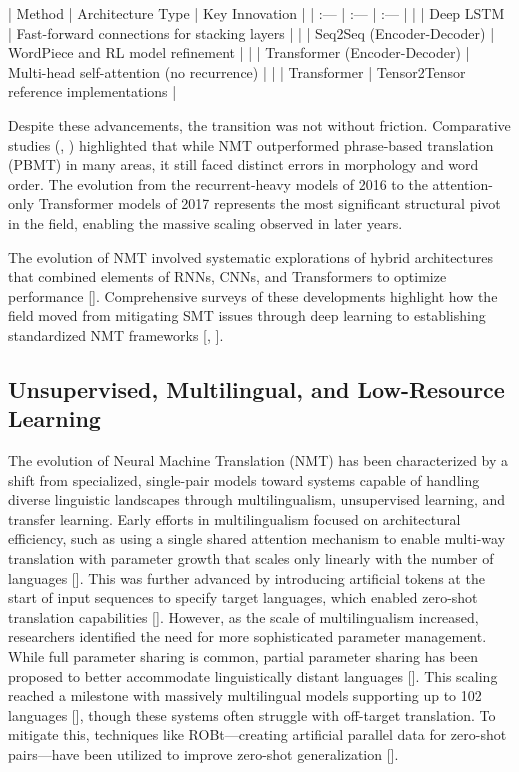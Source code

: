 \documentclass[11pt]{article}
\begin{document}
| Method | Architecture Type | Key Innovation |
| :--- | :--- | :--- |
| \citep{1606.04199} | Deep LSTM | Fast-forward connections for stacking layers |
| \citep{1609.08144} | Seq2Seq (Encoder-Decoder) | WordPiece and RL model refinement |
| \citep{1706.03762} | Transformer (Encoder-Decoder) | Multi-head self-attention (no recurrence) |
| \citep{1803.07416} | Transformer | Tensor2Tensor reference implementations |

Despite these advancements, the transition was not without friction. Comparative studies (\citep{1608.04631}, \citep{1701.02901}) highlighted that while NMT outperformed phrase-based translation (PBMT) in many areas, it still faced distinct errors in morphology and word order. The evolution from the recurrent-heavy models of 2016 to the attention-only Transformer models of 2017 represents the most significant structural pivot in the field, enabling the massive scaling observed in later years.

The evolution of NMT involved systematic explorations of hybrid architectures that combined elements of RNNs, CNNs, and Transformers to optimize performance [\citep{1804.09849}]. Comprehensive surveys of these developments highlight how the field moved from mitigating SMT issues through deep learning to establishing standardized NMT frameworks [\citep{1812.04238}, \citep{2004.04902}].
\subsection{Unsupervised, Multilingual, and Low-Resource Learning}

The evolution of Neural Machine Translation (NMT) has been characterized by a shift from specialized, single-pair models toward systems capable of handling diverse linguistic landscapes through multilingualism, unsupervised learning, and transfer learning. Early efforts in multilingualism focused on architectural efficiency, such as using a single shared attention mechanism to enable multi-way translation with parameter growth that scales only linearly with the number of languages [\citep{1601.01073}]. This was further advanced by introducing artificial tokens at the start of input sequences to specify target languages, which enabled zero-shot translation capabilities [\citep{1611.04558}]. However, as the scale of multilingualism increased, researchers identified the need for more sophisticated parameter management. While full parameter sharing is common, partial parameter sharing has been proposed to better accommodate linguistically distant languages [\citep{1809.00252}]. This scaling reached a milestone with massively multilingual models supporting up to 102 languages [\citep{1903.00089}], though these systems often struggle with off-target translation. To mitigate this, techniques like ROBt—creating artificial parallel data for zero-shot pairs—have been utilized to improve zero-shot generalization [\citep{2004.11867}].
\end{document}
